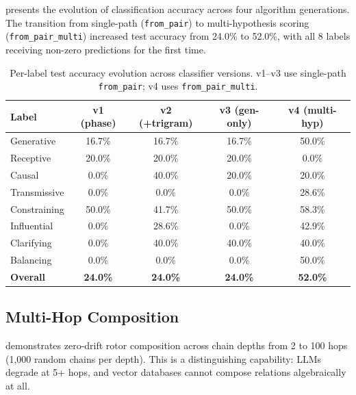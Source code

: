 \documentclass[11pt,a4paper]{article}
\begin{document}
 presents the evolution of classification accuracy
across four algorithm generations. The transition from single-path
(\texttt{from\_pair}) to multi-hypothesis scoring
(\texttt{from\_pair\_multi}) increased test accuracy from 24.0\% to 52.0\%,
with all 8 labels receiving non-zero predictions for the first time.

\begin{table}[ht]
\centering
\caption{Per-label test accuracy evolution across classifier versions.
v1--v3 use single-path \texttt{from\_pair}; v4 uses
\texttt{from\_pair\_multi}.}
\label{tab:classification}
\begin{tabular}{lcccc}
\toprule
\textbf{Label} & \textbf{v1 (phase)} & \textbf{v2 (+trigram)} & \textbf{v3 (gen-only)} & \textbf{v4 (multi-hyp)} \\
\midrule
Generative   & 16.7\% & 16.7\% & 16.7\% & 50.0\% \\
Receptive    & 20.0\% & 20.0\% & 20.0\% &  0.0\% \\
Causal       &  0.0\% & 40.0\% & 20.0\% & 20.0\% \\
Transmissive &  0.0\% &  0.0\% &  0.0\% & 28.6\% \\
Constraining & 50.0\% & 41.7\% & 50.0\% & 58.3\% \\
Influential  &  0.0\% & 28.6\% &  0.0\% & 42.9\% \\
Clarifying   &  0.0\% & 40.0\% & 40.0\% & 40.0\% \\
Balancing    &  0.0\% &  0.0\% &  0.0\% & 50.0\% \\
\midrule
\textbf{Overall} & \textbf{24.0\%} & \textbf{24.0\%} & \textbf{24.0\%} & \textbf{52.0\%} \\
\bottomrule
\end{tabular}
\end{table}

\subsection{Multi-Hop Composition}

 demonstrates zero-drift rotor composition across chain
depths from 2 to 100 hops (1,000 random chains per depth). This is a
distinguishing capability: LLMs degrade at 5+ hops, and vector databases
cannot compose relations algebraically at all.
\end{document}
